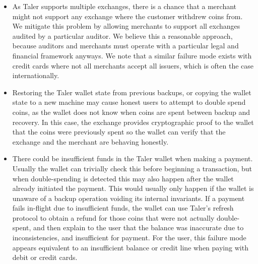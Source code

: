 \documentclass{IEEEtran}
\begin{document}
\begin{itemize}
\item
As Taler supports multiple exchanges, there is a chance that a
merchant might not support any exchange where the customer withdrew
coins from.  We mitigate this problem by allowing merchants to
support all exchanges audited by a particular auditor.  We believe
this a reasonable approach, because auditors and merchants must
operate with a particular legal and financial framework anyways.  We
note that a similar failure mode exists with credit cards where not
all merchants accept all issuers, which is often the case internationally.

\item
Restoring the Taler wallet state from previous backups, or copying the
wallet state to a new machine may cause honest users to attempt to
double spend coins, as the wallet does not know when coins are spent
between backup and recovery.  In this case, the exchange provides
cryptographic proof to the wallet that the coins were previously spent so the
wallet can verify that the exchange and the merchant are behaving honestly.

%
%
%
%
\item
There could be insufficient funds in the Taler wallet when making a
payment.  Usually the wallet can trivially check this before beginning
a transaction, but when double-spending is detected this may also
happen after the wallet already initiated the payment. This would
usually only happen if the wallet is unaware of a backup operation
voiding its internal invariants.  If a payment fails in-flight due to
insufficient funds, the wallet can use Taler's refresh protocol to
obtain a refund for those coins that were not actually double-spent,
and then explain to the user that the balance was inaccurate due to
inconsistencies, and insufficient for payment.
For the user, this failure mode appears equivalent to an insufficient
balance or credit line when paying with debit or credit cards.
\end{itemize}
\end{document}
